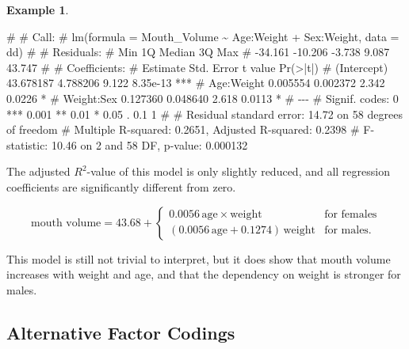 \documentclass[
  a4paper,
]{article}
\newenvironment{Shaded}{\begin{snugshade}}{\end{snugshade}}
\newcommand{\NormalTok}[1]{#1}
\theoremstyle{definition}
\theoremstyle{definition}
\newtheorem{example}{Example}[section]
\theoremstyle{definition}
\theoremstyle{definition}
\theoremstyle{remark}
\begin{document}
\begin{example}
\begin{Shaded}
\begin{Highlighting}[]
\NormalTok{\# }
\NormalTok{\# Call:}
\NormalTok{\# lm(formula = Mouth\_Volume \textasciitilde{} Age:Weight + Sex:Weight, data = dd)}
\NormalTok{\# }
\NormalTok{\# Residuals:}
\NormalTok{\#     Min      1Q  Median      3Q     Max }
\NormalTok{\# {-}34.161 {-}10.206  {-}3.738   9.087  43.747 }
\NormalTok{\# }
\NormalTok{\# Coefficients:}
\NormalTok{\#              Estimate Std. Error t value Pr(\textgreater{}|t|)    }
\NormalTok{\# (Intercept) 43.678187   4.788206   9.122 8.35e{-}13 ***}
\NormalTok{\# Age:Weight   0.005554   0.002372   2.342   0.0226 *  }
\NormalTok{\# Weight:Sex   0.127360   0.048640   2.618   0.0113 *  }
\NormalTok{\# {-}{-}{-}}
\NormalTok{\# Signif. codes:  0 \textquotesingle{}***\textquotesingle{} 0.001 \textquotesingle{}**\textquotesingle{} 0.01 \textquotesingle{}*\textquotesingle{} 0.05 \textquotesingle{}.\textquotesingle{} 0.1 \textquotesingle{} \textquotesingle{} 1}
\NormalTok{\# }
\NormalTok{\# Residual standard error: 14.72 on 58 degrees of freedom}
\NormalTok{\# Multiple R{-}squared:  0.2651,  Adjusted R{-}squared:  0.2398 }
\NormalTok{\# F{-}statistic: 10.46 on 2 and 58 DF,  p{-}value: 0.000132}
\end{Highlighting}
\end{Shaded}

The adjusted \(R^2\)-value of this model is only slightly reduced,
and all regression coefficients are significantly
different from zero.

\begin{equation*}
  \textrm{mouth volume}
  = 43.68
    + \begin{cases}
      0.0056 \, \mathrm{age} \times \mathrm{weight}
          & \mbox{for females} \\
      (0.0056 \, \mathrm{age} + 0.1274) \, \mathrm{weight}
          & \mbox{for males.}
  \end{cases}
\end{equation*}

This model is still not trivial to interpret, but it does show
that mouth volume increases with weight and age, and that the
dependency on weight is stronger for males.
\end{example}

\hypertarget{codings}{%
\subsection{Alternative Factor Codings}\label{codings}}
\end{document}
